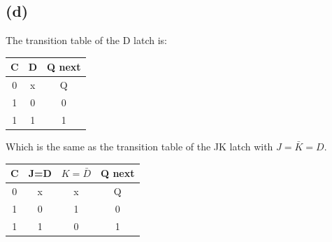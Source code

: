 \documentclass[12pt]{article}
\begin{document}
\subsection*{(d)}
The transition table of  the D latch is:
\begin{center}
    \begin{tabular}{|c|c||c|}
        C & D & Q next \\
        \hline
        0 & x & Q \\
        \hline
        1 & 0 & 0 \\
        \hline
        1 & 1 & 1 \\
        \hline
    \end{tabular}
\end{center}
Which is the same as the transition table of the JK latch with $J=\bar{K}=D$.
\begin{center}
    \begin{tabular}{|c|c|c||c|}
        C & J=D & $K=\bar{D}$ & Q next \\
        \hline
        0 & x & x & Q \\
        \hline
        1 & 0 & 1& 0 \\
        \hline
        1 & 1 & 0 & 1 \\
        \hline
    \end{tabular}
\end{center}
\end{document}
